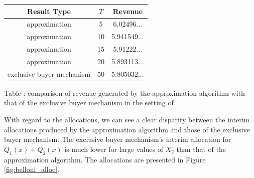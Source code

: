 \documentclass{article}
\newcounter{fig}
\begin{document}
\begin{center}
    \begin{tabular}{ |c|c|c| } 
    \hline
    Result Type & $T$ & Revenue \\
    \hline
    \hline
    approximation & 5 & 6.02496... \\ 
    approximation & 10 & 5.941549... \\ 
    approximation & 15 & 5.91222... \\ 
    approximation & 20 & 5.893113... \\ 
    exclusive buyer mechanism & 50 & 5.805032... \\
    \hline
    \end{tabular}

    \vspace{1mm}
    \raggedright{\small {\sc Table \thefig\label{table:asymm_belloni}:} comparison of revenue generated by the approximation algorithm with that of the exclusive buyer mechanism in the setting of \autocite{belloni2010multidimensional}.}
\end{center}

With regard to the allocations, we can see a clear disparity between the interim allocations produced by the approximation algorithm and those of the exclusive buyer mechanism. The exclusive buyer mechanism's interim allocation for $Q_1(x) + Q_2(x)$ is much lower for large values of $X_2$ than that of the approximation algorithm. The allocations are presented in Figure \ref{fig:belloni_alloc}.
\end{document}
